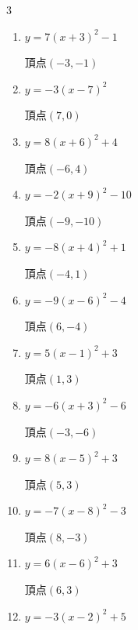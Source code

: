 \begin{multicols}{3}
\begin{enumerate}
        $\displaystyle 頂点\left( -5 , 7 \right)$

  \item $\displaystyle y=7\left( x+3\right)^{2}-1$

        $\displaystyle 頂点\left( -3 , -1 \right)$

  \item $\displaystyle y=-3\left( x-7\right)^{2}$

        $\displaystyle 頂点\left( 7 , 0 \right)$

  \item $\displaystyle y=8\left( x+6\right)^{2}+4$

        $\displaystyle 頂点\left( -6 , 4 \right)$

  \item $\displaystyle y=-2\left( x+9\right)^{2}-10$

        $\displaystyle 頂点\left( -9 , -10 \right)$

  \item $\displaystyle y=-8\left( x+4\right)^{2}+1$

        $\displaystyle 頂点\left( -4 , 1 \right)$

  \item $\displaystyle y=-9\left( x-6\right)^{2}-4$

        $\displaystyle 頂点\left( 6 , -4 \right)$

  \item $\displaystyle y=5\left( x-1\right)^{2}+3$

        $\displaystyle 頂点\left( 1 , 3 \right)$

  \item $\displaystyle y=-6\left( x+3\right)^{2}-6$

        $\displaystyle 頂点\left( -3 , -6 \right)$

  \item $\displaystyle y=8\left( x-5\right)^{2}+3$

        $\displaystyle 頂点\left( 5 , 3 \right)$

  \item $\displaystyle y=-7\left( x-8\right)^{2}-3$

        $\displaystyle 頂点\left( 8 , -3 \right)$

  \item $\displaystyle y=6\left( x-6\right)^{2}+3$

        $\displaystyle 頂点\left( 6 , 3 \right)$

  \item $\displaystyle y=-3\left( x-2\right)^{2}+5$


\end{enumerate}
\end{multicols}
